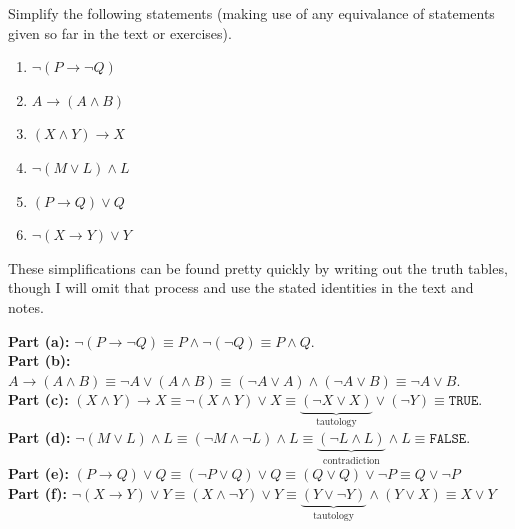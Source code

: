 \documentclass[11pt]{article}
\begin{document}
\pagebreak

\begin{homeworkProblem}

Simplify the following statements (making use of any equivalance of statements given so far in the text or exercises).

\begin{enumerate}[label=(\alph*), topsep=5pt, itemsep=2pt]
    \item $\lnot (P \rightarrow \lnot Q)$
    \item $A \rightarrow (A \land B)$
    \item $(X \land Y) \rightarrow X$
    \item $\lnot(M \lor L) \land L$
    \item $(P \rightarrow Q) \lor Q$
    \item $\lnot (X \rightarrow Y) \lor Y$
\end{enumerate} \vspace{1\baselineskip}

\solution

These simplifications can be found pretty quickly by writing out the truth tables, though I will omit that process and use the stated identities in the text and notes. \vspace{1\baselineskip}

\textbf{Part (a):} $\lnot (P \rightarrow \lnot Q) \equiv P \land \lnot (\lnot Q) \equiv P \land Q$. \\

\textbf{Part (b):} $A \rightarrow (A \land B) \equiv \lnot A \lor (A \land B) \equiv (\lnot A \lor A) \land (\lnot A \lor B) \equiv \lnot A \lor B$. \\

\textbf{Part (c):} $(X \land Y) \rightarrow X \equiv \lnot(X \land Y) \lor X \equiv \mathord{\underbrace{(\lnot X \lor X)}_{\text{tautology}}} \lor (\lnot Y) \equiv \texttt{TRUE}$. \\

\textbf{Part (d):} $\lnot(M \lor L) \land L \equiv (\lnot M \land \lnot L) \land L \equiv \mathord{\underbrace{(\lnot L \land L)}_{\text{contradiction}}} \land L \equiv \texttt{FALSE}$. \\

\textbf{Part (e):} $(P \rightarrow Q) \lor Q \equiv (\lnot P \lor Q) \lor Q \equiv (Q \lor Q) \lor \lnot P \equiv Q \lor \lnot P$ \\

\textbf{Part (f):} $\lnot (X \rightarrow Y) \lor Y \equiv (X \land \lnot Y) \lor Y \equiv \mathord{\underbrace{(Y \lor \lnot Y)}_{\text{tautology}}} \land (Y \lor X) \equiv X \lor Y$



\end{homeworkProblem}
\end{document}
